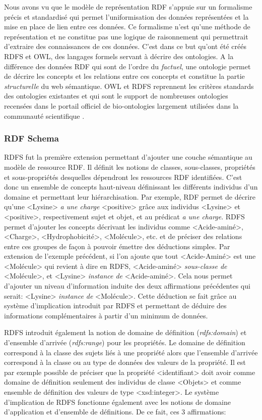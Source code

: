 Nous avons vu que le modèle de représentation RDF s'appuie sur un formalisme précis et standardisé qui permet l'uniformisation des données représentées et la mise en place de lien entre ces données. Ce formalisme n'est qu'une méthode de représentation et ne constitue pas une logique de raisonnement qui permettrait d'extraire des connaissances de ces données. C'est dans ce but qu'ont été créés RDFS et OWL, des langages formels servant à décrire des ontologies. A la différence des données RDF qui sont de l'ordre du \textit{factuel}, une ontologie permet de décrire les concepts et les relations entre ces concepts et constitue la partie \textit{structurelle} du web sémantique.
OWL et RDFS reprennent les critères standards des ontologies existantes et qui sont le support de nombreuses ontologies recensées dans le portail officiel de bio-ontologies largement utilisées dans la communauté scientifique \cite{smith_obo_2007}.

\subsubsection{RDF Schema} \label{rdfs}

RDFS fut la première extension permettant d'ajouter une couche sémantique au modèle de ressource RDF. Il définit les notions de classes, sous-classes, propriétés et sous-propriétés desquelles dépendront les ressources RDF identifiées. C'est donc un ensemble de concepts haut-niveau définissant les différents individus d'un domaine et permettant leur hiérarchisation. 
Par exemple, RDF permet de décrire qu'une <Lysine> \textit{a une charge} <positive> grâce aux individus <Lysine> et <positive>, respectivement sujet et objet, et au prédicat \textit{a une charge}. RDFS permet d'ajouter les concepts décrivant les individus comme <Acide-aminé>, <Charge>, <Hydrophobicité>, <Molécule>, etc. et de préciser des relations entre ces groupes de façon à pouvoir émettre des déductions simples. Par extension de l'exemple précédent, si l'on ajoute que tout <Acide-Aminé> est une <Molécule> qui revient à dire en RDFS, <Acide-aminé> \textit{sous-classe de} <Molécule>, et <Lysine> \textit{instance de} <Acide-aminé>. Cela nous permet d'ajouter un niveau d'information induite des deux affirmations précédentes qui serait: <Lysine> \textit{instance de} <Molécule>. Cette déduction se fait grâce au système d'implication introduit par RDFS et permettant de déduire des informations complémentaires à partir d'un minimum de données.

RDFS introduit également la notion de domaine de définition (\textit{rdfs:domain}) et d'ensemble d'arrivée (\textit{rdfs:range}) pour les propriétés. Le domaine de définition correspond à la classe des sujets liés à une propriété alors que l'ensemble d'arrivée correspond à la classe ou au type de données des valeurs de la propriété. Il est par exemple possible de préciser que la propriété <identifiant> doit avoir comme domaine de définition seulement des individus de classe <Objets> et comme ensemble de définition des valeurs de type <xsd:integer>.
Le système d'implication de RDFS fonctionne également avec les notions de domaine d'application et d'ensemble de définitions. De ce fait, ces 3 affirmations:


